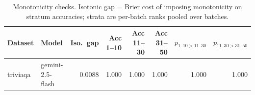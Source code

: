 \begin{table}[t]
\centering
\small
\begin{tabular}{llrrrrrr}
\toprule
Dataset & Model & Iso.\ gap & Acc 1--10 & Acc 11--30 & Acc 31--50 & $p_{1\text{--}10>11\text{--}30}$ & $p_{11\text{--}30>31\text{--}50}$ \\
\midrule
triviaqa & gemini-2.5-flash & 0.0088 & 1.000 & 1.000 & 1.000 & 1.000 & 1.000 \\
\bottomrule
\end{tabular}
\caption{Monotonicity checks. Isotonic gap = Brier cost of imposing monotonicity on stratum accuracies; strata are per-batch ranks pooled over batches.}
\label{tab:mono}
\end{table}
